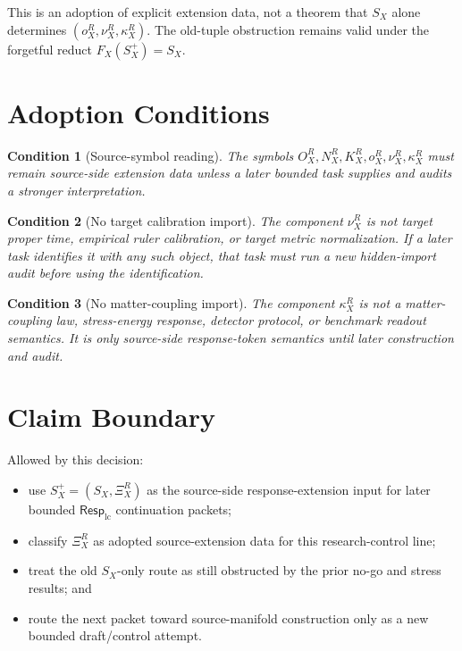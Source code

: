 \documentclass[11pt]{article}
\newcommand{\RespLC}{\mathsf{Resp}_{\mathrm{lc}}}
\newcommand{\XiR}{\Xi_X^R}
\newcommand{\SX}{S_X}
\newcommand{\Splus}{S_X^+}
\newtheorem{condition}{Condition}
\begin{document}
This is an adoption of explicit extension data, not a theorem that
\(\SX\) alone determines \((o_X^R,\nu_X^R,\kappa_X^R)\). The old-tuple
obstruction remains valid under the forgetful reduct \(F_X(\Splus)=\SX\).

\section{Adoption Conditions}

\begin{condition}[Source-symbol reading]
The symbols \(O_X^R,N_X^R,K_X^R,o_X^R,\nu_X^R,\kappa_X^R\) must remain
source-side extension data unless a later bounded task supplies and audits
a stronger interpretation.
\end{condition}

\begin{condition}[No target calibration import]
The component \(\nu_X^R\) is not target proper time, empirical ruler
calibration, or target metric normalization. If a later task identifies it
with any such object, that task must run a new hidden-import audit before
using the identification.
\end{condition}

\begin{condition}[No matter-coupling import]
The component \(\kappa_X^R\) is not a matter-coupling law, stress-energy
response, detector protocol, or benchmark readout semantics. It is only
source-side response-token semantics until later construction and audit.
\end{condition}

\section{Claim Boundary}

Allowed by this decision:
\begin{itemize}
  \item use \(\Splus=(\SX,\XiR)\) as the source-side response-extension
  input for later bounded \(\RespLC\) continuation packets;
  \item classify \(\XiR\) as adopted source-extension data for this
  research-control line;
  \item treat the old \(\SX\)-only route as still obstructed by the
  prior no-go and stress results; and
  \item route the next packet toward source-manifold construction only as
  a new bounded draft/control attempt.
\end{itemize}
\end{document}
